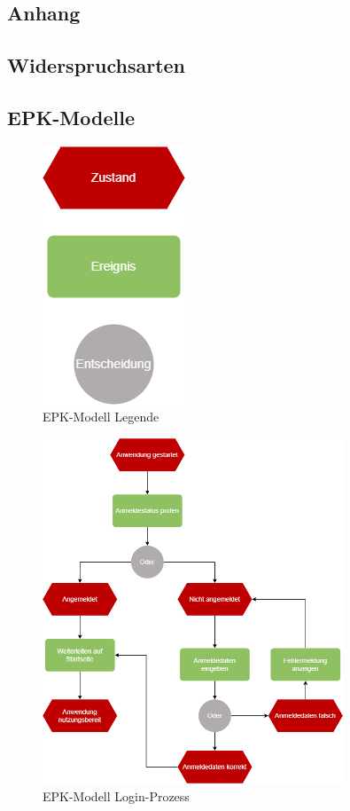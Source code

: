 \begin{appendix}
  \section{Anhang}\label{sec:anhang}

  \subsection{Widerspruchsarten}\label{subsection:widerspruchsarten}
  

  \subsection{EPK-Modelle}\label{subsec:epk-modelle}

  \begin{figure}[H]
        \centering
        \includegraphics[]{images/ReQ_EPK_Legende}
        \caption{EPK-Modell Legende}
        \label{fig:epk_legende}
    \end{figure}

    \begin{figure}[H]
        \centering
        \includegraphics[width=0.8\textwidth]{images/ReQ_Login_EPK}
        \caption{EPK-Modell Login-Prozess}
        \label{fig:epk_login}
    \end{figure}


\end{appendix}
